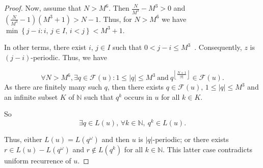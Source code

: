 \documentclass[10pt,a4paper]{amsart}
\begin{document}
\begin{proof}
Now, assume that $N>M^6$. Then $\frac{N}{M^3}-M^3>0$ and  $(\frac{N}{M^3}-1)(M^3+1)>N-1$. Thus, for $N>M^6$ we have $\min\left\{j-i: i,\, j\in I, \, i<j\right\}<M^3+1$.

In other terms,  there exist $i,\,j\in I$ such that $0<j-i\leq M^3$~. Consequently, $z$ is $(j-i)$-periodic. Thus, we have

%
%
$$\forall N>M^6,\exists q\in \mathcal{F}(u): 1\leq |q|\leq M^3\ \textrm{and}\  q^{\left\lfloor \frac{N+1}{\left|q\right|}\right\rfloor}\in \mathcal{F}(u).$$
As there are finitely many such $q$, then there exists $q\in \mathcal{F}(u),\, 1\leq |q|\leq M^3$ and an  infinite subset $K$ of $\mathbb{N}$ such that $q^k$ occurs in $u$ for all $k\in K$.
 
So
$$ \exists q\in L(u),\,   \forall k\in \mathbb{N},\ q^k \in L(u).$$


Thus, either $L(u)=L(q^\omega) $ and then $u$ is $|q|$-periodic; or there exists  $r\in L(u)-L(q^\omega)$ and $r\notin L(q^k)$ for all $k\in \mathbb{N}$. 
This latter  case contradicts uniform recurrence of $u$.  \end{proof}
\end{document}

